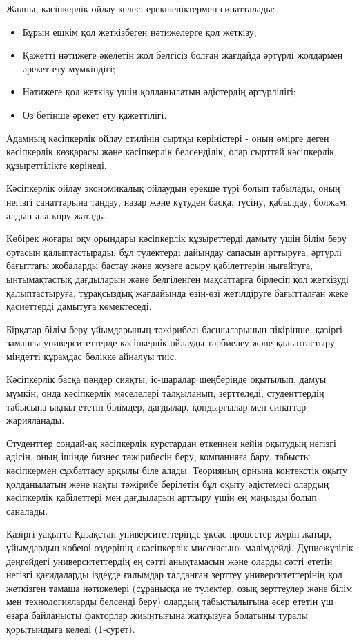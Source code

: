 \begin{multicols}{2}
Жалпы, кәсіпкерлік ойлау келесі ерекшеліктермен сипатталады:

\begin{itemize}
\item
  Бұрын ешкім қол жеткізбеген нәтижелерге қол жеткізу;
\item
  Қажетті нәтижеге әкелетін жол белгісіз болған жағдайда әртүрлі
  жолдармен әрекет ету мүмкіндігі;
\item
  Нәтижеге қол жеткізу үшін қолданылатын әдістердің әртүрлілігі;
\item
  Өз бетінше әрекет ету қажеттілігі.
\end{itemize}

Адамның кәсіпкерлік ойлау стилінің сыртқы көріністері - оның өмірге
деген кәсіпкерлік көзқарасы және кәсіпкерлік белсенділік, олар сырттай
кәсіпкерлік құзыреттілікте көрінеді.

Кәсіпкерлік ойлау экономикалық ойлаудың ерекше түрі болып табылады, оның
негізгі санаттарына таңдау, назар және күтуден басқа, түсіну, қабылдау,
болжам, алдын ала көру жатады.

Көбірек жоғары оқу орындары кәсіпкерлік құзыреттерді дамыту үшін білім
беру ортасын қалыптастырады, бұл түлектерді дайындау сапасын арттыруға,
әртүрлі бағыттағы жобаларды бастау және жүзеге асыру қабілеттерін
нығайтуға, ынтымақтастық дағдыларын және белгіленген мақсаттарға
бірлесіп қол жеткізуді қалыптастыруға, тұрақсыздық жағдайында өзін-өзі
жетілдіруге бағытталған жеке қасиеттерді дамытуға көмектеседі.

Бірқатар білім беру ұйымдарының тәжірибелі басшыларының пікірінше,
қазіргі заманғы университеттерде кәсіпкерлік ойлауды тәрбиелеу және
қалыптастыру міндетті құрамдас бөлікке айналуы тиіс.

Кәсіпкерлік басқа пәндер сияқты, іс-шаралар шеңберінде оқытылып, дамуы
мүмкін, онда кәсіпкерлік мәселелері талқыланып, зерттеледі,
студенттердің табысына ықпал ететін білімдер, дағдылар, қондырғылар мен
сипаттар жарияланады.

Студенттер сондай-ақ кәсіпкерлік курстардан өткеннен кейін оқытудың
негізгі әдісін, оның ішінде бизнес тәжірибесін беру, компанияға бару,
табысты кәсіпкермен сұхбаттасу арқылы біле алады. Теорияның орнына
контекстік оқыту қолданылатын және нақты тәжірибе берілетін бұл оқыту
әдістемесі олардың кәсіпкерлік қабілеттері мен дағдыларын арттыру үшін
ең маңызды болып саналады.

Қазіргі уақытта Қазақстан университеттерінде ұқсас процестер жүріп
жатыр, ұйымдардың көбеюі өздерінің «кәсіпкерлік миссиясын» мәлімдейді.
Дүниежүзілік деңгейдегі университеттердің ең сәтті анықтамасын және
оларды сәтті ететін негізгі қағидаларды іздеуде ғалымдар талданған
зерттеу университеттерінің қол жеткізген тамаша нәтижелері (сұранысқа ие
түлектер, озық зерттеулер және білім мен технологияларды белсенді беру)
олардың табыстылығына әсер ететін үш өзара байланысты факторлар
жиынтығына жатқызуға болатыны туралы қорытындыға келеді (1-сурет).


\end{multicols}

